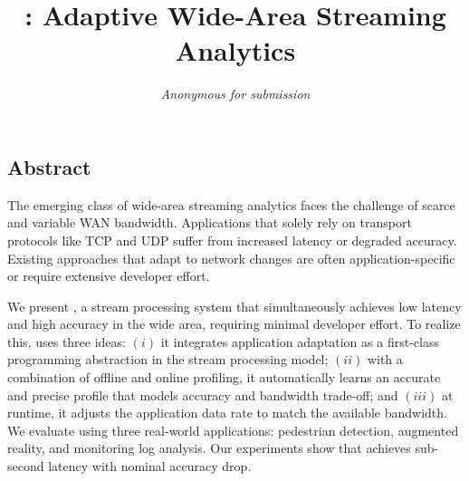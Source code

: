 \documentclass[twocolumn, 9pt]{article}
\begin{document}
\date{}



\title{\sysname{}: Adaptive Wide-Area Streaming Analytics}

\author{
  \textit{Anonymous for submission}
}

\maketitle

\subsection*{Abstract}

The emerging class of wide-area streaming analytics faces the challenge of
scarce and variable WAN bandwidth. Applications that solely rely on transport
protocols like TCP and UDP suffer from increased latency or degraded
accuracy. Existing approaches that adapt to network changes are often
application-specific or require extensive developer effort.

We present \sysname{}, a stream processing system that simultaneously achieves
low latency and high accuracy in the wide area, requiring minimal developer
effort. To realize this, \sysname{} uses three ideas: $(i)$ it integrates
application adaptation as a first-class programming abstraction in the stream
processing model; $(ii)$ with a combination of offline and online profiling, it
automatically learns an accurate and precise profile that models accuracy and
bandwidth trade-off; and $(iii)$ at runtime, it adjusts the application data
rate to match the available bandwidth. We evaluate \sysname{} using three
real-world applications: pedestrian detection, augmented reality, and monitoring
log analysis. Our experiments show that \sysname{} achieves sub-second latency
with nominal accuracy drop.










% 

{\footnotesize 
}

\begin{appendices}

\end{appendices}
\end{document}
